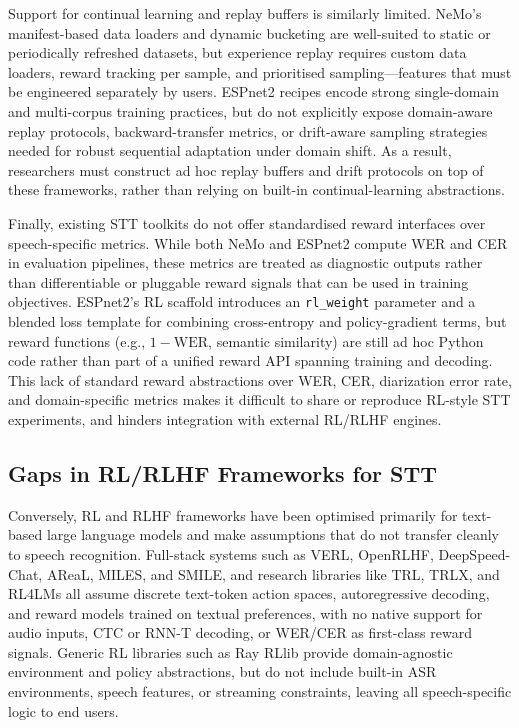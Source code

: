 \documentclass[conference]{IEEEtran}
\begin{document}
Support for continual learning and replay buffers is similarly limited.
NeMo’s manifest-based data loaders and dynamic bucketing are well-suited to static or periodically refreshed datasets, but experience replay requires custom data loaders, reward tracking per sample, and prioritised sampling—features that must be engineered separately by users.
ESPnet2 recipes encode strong single-domain and multi-corpus training practices, but do not explicitly expose domain-aware replay protocols, backward-transfer metrics, or drift-aware sampling strategies needed for robust sequential adaptation under domain shift.
As a result, researchers must construct ad hoc replay buffers and drift protocols on top of these frameworks, rather than relying on built-in continual-learning abstractions.

Finally, existing STT toolkits do not offer standardised reward interfaces over speech-specific metrics.
While both NeMo and ESPnet2 compute WER and CER in evaluation pipelines, these metrics are treated as diagnostic outputs rather than differentiable or pluggable reward signals that can be used in training objectives.
ESPnet2’s RL scaffold introduces an \texttt{rl\_weight} parameter and a blended loss template for combining cross-entropy and policy-gradient terms, but reward functions (e.g., \(1 - \text{WER}\), semantic similarity) are still ad hoc Python code rather than part of a unified reward API spanning training and decoding.
This lack of standard reward abstractions over WER, CER, diarization error rate, and domain-specific metrics makes it difficult to share or reproduce RL-style STT experiments, and hinders integration with external RL/RLHF engines.

\subsection{Gaps in RL/RLHF Frameworks for STT}

Conversely, RL and RLHF frameworks have been optimised primarily for text-based large language models and make assumptions that do not transfer cleanly to speech recognition.
Full-stack systems such as VERL, OpenRLHF, DeepSpeed-Chat, AReaL, MILES, and SMILE, and research libraries like TRL, TRLX, and RL4LMs all assume discrete text-token action spaces, autoregressive decoding, and reward models trained on textual preferences, with no native support for audio inputs, CTC or RNN-T decoding, or WER/CER as first-class reward signals.
Generic RL libraries such as Ray RLlib provide domain-agnostic environment and policy abstractions, but do not include built-in ASR environments, speech features, or streaming constraints, leaving all speech-specific logic to end users.
\end{document}
